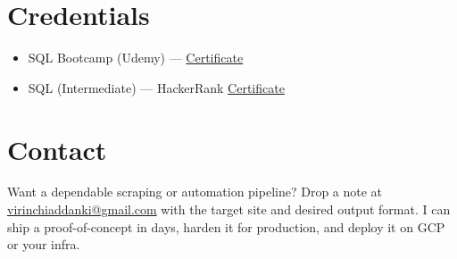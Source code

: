 \documentclass[11pt]{article}
\begin{document}
\section*{Credentials}
\begin{itemize}
  \item SQL Bootcamp (Udemy) --- \href{https://www.udemy.com/certificate/UC-d3b76d22-69b1-45dc-86fd-7a969b920a5e/}{Certificate}
  \item SQL (Intermediate) --- HackerRank \href{https://www.hackerrank.com/certificates/4e195a7134d8}{Certificate}
\end{itemize}

\section*{Contact}
Want a dependable scraping or automation pipeline? Drop a note at \href{mailto:virinchiaddanki@gmail.com}{virinchiaddanki@gmail.com} with the target site and desired output format. I can ship a proof-of-concept in days, harden it for production, and deploy it on GCP or your infra.
\end{document}
